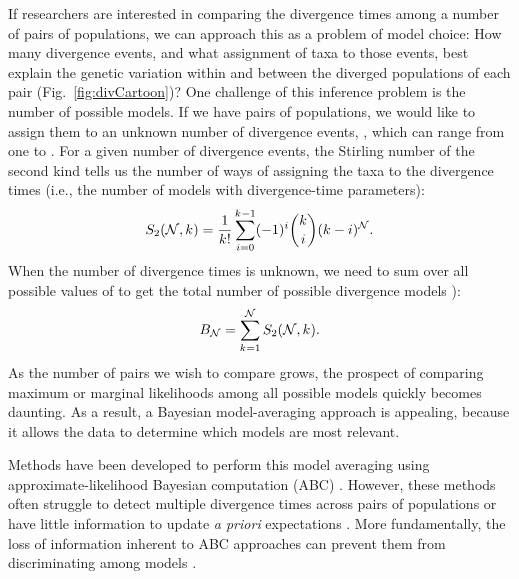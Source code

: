 \begin{linenomath}
If researchers are interested in comparing the divergence times among a number
of pairs of populations,
we can approach this as a problem of model choice:
How many divergence events, and what assignment of taxa to those events, best
explain the genetic variation within and between the diverged populations of
each pair (Fig.~\ref{fig:divCartoon})?
One challenge of this inference problem is the number of possible models.
If we have \ncomparisons{} pairs of populations, we would like to assign them to an
unknown number of divergence events, \nevents{}, which can range from one to
\ncomparisons{}.
For a given number of divergence events, the Stirling number of the second kind
tells us the number of ways of assigning the taxa to the divergence times
(i.e., the number of models with \nevents{} divergence-time parameters):
\begin{equation}
    S_2(\mathcal{N}, k_{}) = 
    \frac{1}{k_{}!} \sum_{i = 0}^{k_{} - 1} (-1)^{i}
    \binom{k_{}}{i} (k_{} - i)^{\mathcal{N}}.
    \label{eq:stirling2}
\end{equation}
When the number of divergence times is unknown, we need to sum over all
possible values of \nevents{} to get the total number of possible divergence
models
\citep[the Bell number;][]{Bell1934}):
\begin{equation}
    B_{\mathcal{N}} = \sum_{k_{} = 1}^{\mathcal{N}}
    S_2(\mathcal{N}, k_{}).
    \label{eq:bell}
\end{equation}
As the number of pairs we wish to compare grows, the prospect of comparing
maximum or marginal likelihoods among all possible models quickly becomes
daunting.
As a result, a Bayesian model-averaging approach is appealing, because it
allows the data to determine which models are most relevant.
\end{linenomath}

Methods have been developed to perform this model averaging using
approximate-likelihood Bayesian computation (ABC)
\citep{Hickerson2006,Huang2011,Oaks2014dpp}.
However, these methods often struggle to detect multiple divergence times
across pairs of populations \citep{Oaks2012, Oaks2014reply} or have little
information to update \emph{a priori} expectations \citep{Oaks2014dpp}.
More fundamentally, the loss of information inherent to ABC approaches can
prevent them from discriminating among models
\citep{Robert2011,Marin2014,Green2015}.

